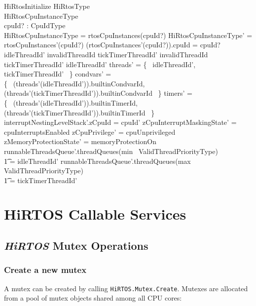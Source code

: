 \documentclass[11pt,letterpaper,twoside,openany]{book}
\begin{document}
\begin{schema}{HiRtosInitialize}
   \Delta HiRtosType \\
   \Delta HiRtosCpuInstanceType \\
   cpuId? : CpuIdType \\
\where
   \theta HiRtosCpuInstanceType = rtosCpuInstances(cpuId?)
\also
   \theta HiRtosCpuInstanceType' = rtosCpuInstances'(cpuId?)
\also
   (rtosCpuInstances'(cpuId?)).cpuId = cpuId?
\also
    idleThreadId' \neq invalidThreadId
\also
    tickTimerThreadId' \neq invalidThreadId
\also
    tickTimerThreadId' \neq idleThreadId'
\also
    \dom threads' = \{~ idleThreadId', tickTimerThreadId' ~\}
\also
    \dom condvars' = \\
   \{~ (threads'(idleThreadId')).builtinCondvarId, \\
      (threads'(tickTimerThreadId')).builtinCondvarId ~\}
\also
    \dom timers' = \\
   \{~ (threads'(idleThreadId')).builtinTimerId, \\
       (threads'(tickTimerThreadId')).builtinTimerId ~\}
\also
   interruptNestingLevelStack'.zCpuId = cpuId'
\also
    zCpuInterruptMaskingState' = cpuInterruptsEnabled
\also
    zCpuPrivilege' = cpuUnprivileged
\also
    zMemoryProtectionState' = memoryProtectionOn
\also
    runnableThreadsQueue'.threadQueues(min~ ValidThreadPriorityType) \\
    \t1 = \langle idleThreadId' \rangle
\also
    runnableThreadsQueue'.threadQueues(max~ ValidThreadPriorityType) \\
    \t1 = \langle tickTimerThreadId' \rangle
\end{schema}

\section{HiRTOS Callable Services}

\subsection{\emph{HiRTOS} Mutex Operations}

\subsubsection{Create a new mutex}

A mutex can be created by calling \verb`HiRTOS.Mutex.Create`. Mutexes are allocated from a pool of
mutex objects shared among all CPU cores:
\end{document}
